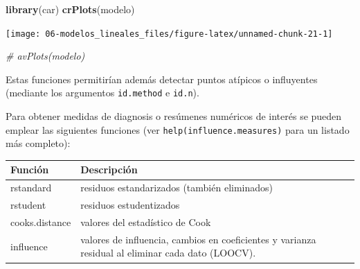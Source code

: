 \documentclass[
]{book}
\newenvironment{Shaded}{\begin{snugshade}}{\end{snugshade}}
\newcommand{\CommentTok}[1]{\textcolor[rgb]{0.56,0.35,0.01}{\textit{#1}}}
\newcommand{\KeywordTok}[1]{\textcolor[rgb]{0.13,0.29,0.53}{\textbf{#1}}}
\newcommand{\NormalTok}[1]{#1}
\theoremstyle{break}
\theoremstyle{definition}
\theoremstyle{definition}
\theoremstyle{definition}
\theoremstyle{remark}
\begin{document}
\begin{Shaded}
\begin{Highlighting}[]
\KeywordTok{library}\NormalTok{(car)}
\KeywordTok{crPlots}\NormalTok{(modelo)}
\end{Highlighting}
\end{Shaded}

\begin{center}\texttt{[image: 06-modelos\_lineales\_files/figure-latex/unnamed-chunk-21-1]} \end{center}

\begin{Shaded}
\begin{Highlighting}[]
\CommentTok{# avPlots(modelo)}
\end{Highlighting}
\end{Shaded}

Estas funciones permitirían además detectar puntos atípicos o influyentes
(mediante los argumentos \texttt{id.method} e \texttt{id.n}).

Para obtener medidas de diagnosis o resúmenes numéricos de interés se pueden emplear
las siguientes funciones (ver \texttt{help(influence.measures)} para un listado más completo):

\begin{longtable}[]{@{}ll@{}}
\toprule
\begin{minipage}[b]{0.10\columnwidth}\raggedright
Función\strut
\end{minipage} & \begin{minipage}[b]{0.85\columnwidth}\raggedright
Descripción\strut
\end{minipage}\tabularnewline
\midrule
\endhead
\begin{minipage}[t]{0.10\columnwidth}\raggedright
rstandard\strut
\end{minipage} & \begin{minipage}[t]{0.85\columnwidth}\raggedright
residuos estandarizados (también eliminados)\strut
\end{minipage}\tabularnewline
\begin{minipage}[t]{0.10\columnwidth}\raggedright
rstudent\strut
\end{minipage} & \begin{minipage}[t]{0.85\columnwidth}\raggedright
residuos estudentizados\strut
\end{minipage}\tabularnewline
\begin{minipage}[t]{0.10\columnwidth}\raggedright
cooks.distance\strut
\end{minipage} & \begin{minipage}[t]{0.85\columnwidth}\raggedright
valores del estadístico de Cook\strut
\end{minipage}\tabularnewline
\begin{minipage}[t]{0.10\columnwidth}\raggedright
influence\strut
\end{minipage} & \begin{minipage}[t]{0.85\columnwidth}\raggedright
valores de influencia, cambios en coeficientes y varianza residual al eliminar cada dato (LOOCV).\strut
\end{minipage}\tabularnewline
\bottomrule
\end{longtable}
\end{document}
